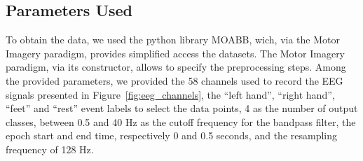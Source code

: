 \subsection*{Parameters Used}
To obtain the data, we used the python library MOABB, wich, via the Motor Imagery paradigm, provides simplified access the datasets.
The Motor Imagery paradigm, via its constructor, allows to specify the preprocessing steps.
Among the provided parameters, we provided the 58 channels used to record the EEG signals presented in Figure~\ref{fig:eeg_channels}, the ``left hand'', ``right hand'', ``feet'' and ``rest'' event labels to select the data points, 4 as the number of output classes, between 0.5 and 40 Hz as the cutoff frequency for the bandpass filter, the epoch start and end time, respectively 0 and 0.5 seconds, and the resampling frequency of 128 Hz.


